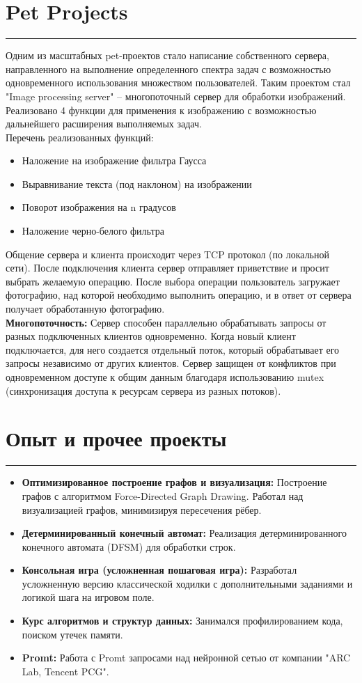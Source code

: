 \documentclass[a4paper,14pt]{article}
\begin{document}
\section*{Pet Projects}
\hrule
\vspace{0.5em}
Одним из масштабных pet-проектов стало написание собственного сервера, направленного на выполнение определенного спектра задач с возможностью одновременного использования множеством пользователей. Таким проектом стал "Image processing server" – многопоточный сервер для обработки изображений. Реализовано 4 функции для применения к изображению с возможностью дальнейшего расширения выполняемых задач. \\
Перечень реализованных функций:
\begin{itemize}
    \item Наложение на изображение фильтра Гаусса
    \item Выравнивание текста (под наклоном) на изображении
    \item Поворот изображения на n градусов
    \item Наложение черно-белого фильтра
\end{itemize}
Общение сервера и клиента происходит через TCP протокол (по локальной сети). После подключения клиента сервер отправляет приветствие и просит выбрать желаемую операцию. После выбора операции пользователь загружает фотографию, над которой необходимо выполнить операцию, и в ответ от сервера получает обработанную фотографию. \\
\textbf{Многопоточность:} Сервер способен параллельно обрабатывать запросы от разных подключенных клиентов одновременно. Когда новый клиент подключается, для него создается отдельный поток, который обрабатывает его запросы независимо от других клиентов. Сервер защищен от конфликтов при одновременном доступе к общим данным благодаря использованию mutex (синхронизация доступа к ресурсам сервера из разных потоков).

\section*{Опыт и прочее проекты}
\hrule
\vspace{0.5em}
\begin{itemize}
    \item \textbf{Оптимизированное построение графов и визуализация:} Построение графов с алгоритмом Force-Directed Graph Drawing. Работал над визуализацией графов, минимизируя пересечения рёбер.
    \item \textbf{Детерминированный конечный автомат:}
    Реализация детерминированного конечного автомата (DFSM) для обработки строк.
    \item \textbf{Консольная игра (усложненная пошаговая игра):} Разработал усложненную версию классической ходилки с дополнительными заданиями и логикой шага на игровом поле.
    \item \textbf{Курс алгоритмов и структур данных:} Занимался профилированием кода, поиском утечек памяти.
    \item \textbf{Promt:} Работа с Promt запросами над нейронной сетью от компании "ARC Lab, Tencent PCG".
\end{itemize}
\end{document}
